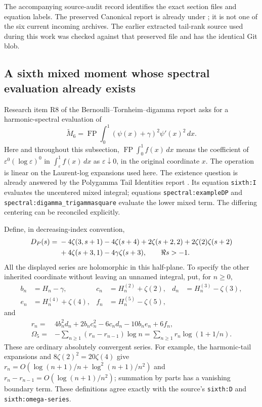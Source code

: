 \documentclass[11pt]{article}
\theoremstyle{definition}
\theoremstyle{remark}
\numberwithin{equation}{section}
\DeclareMathOperator{\FP}{FP}
\begin{document}
The accompanying source-audit record identifies the exact section files
and equation labels. The preserved Canonical report is already under
;
it is not one of the six current incoming archives. The earlier extracted
tail-rank source used during this work was checked against that preserved
file and has the identical Git blob.

\subsection{A sixth mixed moment whose spectral evaluation already exists}
\label{sh:audit-sixth}

Research item R8 of the Bernoulli--Tornheim--digamma report asks for a
harmonic-spectral evaluation of
\[
 \widetilde M_6=\FP\int_0^1(\psi(x)+\gamma)^2\psi'(x)^2\,dx.
\]
Here and throughout this subsection, $\FP\int_0^1f(x)\,dx$ means the
coefficient of $\varepsilon^0(\log\varepsilon)^0$ in
$\int_\varepsilon^1f(x)\,dx$ as $\varepsilon\downarrow0$, in the
original coordinate $x$. The operation is linear on the Laurent-log
expansions used here. The existence question is already answered by
the Polygamma Tail Identities report \cite{Polygamma}. Its equation
\texttt{sixth:I} evaluates the uncentered mixed integral; equations
\texttt{spectral:exampleDP} and
\texttt{spectral:digamma\_trigammasquare} evaluate the lower mixed term.
The differing centering can be reconciled explicitly.

Define, in decreasing-index convention,
\begin{align}\label{audit:DP}
 D_P(s)={}&-4\zeta(3,s+1)-4\zeta(s+4)
          +2\zeta(s+2,2)+2\zeta(2)\zeta(s+2)\notag\\
         &+4\zeta(s+3,1)-4\gamma\zeta(s+3),\qquad \Re s>-1.
\end{align}
All the displayed series are holomorphic in this half-plane. To specify
the other inherited coordinate without leaving an unnamed integral,
put, for $n\ge0$,
\begin{align*}
 b_n&=H_n-\gamma,&c_n&=H_n^{(2)}+\zeta(2),&
 d_n&=H_n^{(3)}-\zeta(3),\\
 e_n&=H_n^{(4)}+\zeta(4),&f_n&=H_n^{(5)}-\zeta(5),
\end{align*}
and
\begin{align}
 r_n={}&4b_n^2d_n+2b_nc_n^2-6c_nd_n-10b_ne_n+6f_n,
       \label{audit:residue}\\
 \Omega_5={}&-\sum_{n\ge1}(r_n-r_{n-1})\log n
           =\sum_{n\ge1}r_n\log(1+1/n).\label{audit:Omega}
\end{align}
These are ordinary absolutely convergent series. For example, the
harmonic-tail expansions and $8\zeta(2)^2=20\zeta(4)$ give
$r_n=O(\log(n+1)/n+\log^2(n+1)/n^2)$ and
$r_n-r_{n-1}=O(\log(n+1)/n^2)$; summation by parts has a vanishing
boundary term. These definitions agree exactly with the source's
\texttt{sixth:D} and \texttt{sixth:omega-series}.
\end{document}
